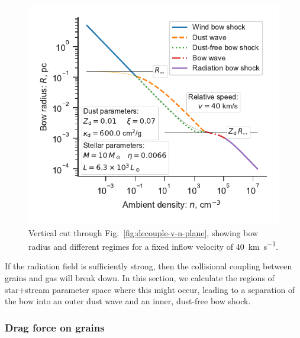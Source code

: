 \begin{figure}
  \includegraphics[width=\linewidth]{figs/decouple-v40-versus-n}
  \caption{Vertical cut through Fig.~\ref{fig:decouple-v-n-plane},
    showing bow radius and different regimes for a fixed inflow
    velocity of \SI{40}{km.s^{-1}}.}
  \label{fig:decouple-v40-versus-n}
\end{figure}


If the radiation field is sufficiently strong, then the collisional
coupling between grains and gas will break down.  In this section, we
calculate the regions of star+stream parameter space where this might
occur, leading to a separation of the bow into an outer dust wave and
an inner, dust-free bow shock.

\subsubsection{Drag force on grains}
\label{sec:drag-force-grains}

